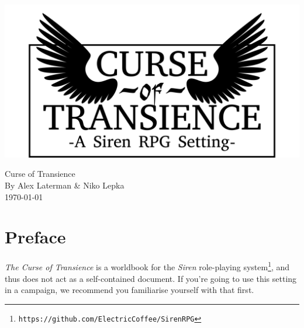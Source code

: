 \documentclass[a4paper]{book}
\begin{document}
\begin{titlepage}
    \begin{center}
        \includegraphics[width = \textwidth]{graphics/logo-winged.png}
    \end{center}
\end{titlepage}
\thispagestyle{empty}
\frontmatter
\begin{center}
    \Huge{Curse of Transience}\\
    \Large{By Alex Laterman \& Niko Lepka}\\
    \large{\today}
\end{center}
\chapter*{Preface}
\textit{The Curse of Transience} is a worldbook for the \textit{Siren} role-playing system\footnote{\texttt{https://github.com/ElectricCoffee/SirenRPG}}, and thus does not act as a self-contained document.
If you're going to use this setting in a campaign, we recommend you familiarise yourself with that first.
\tableofcontents
\mainmatter



\end{document}
